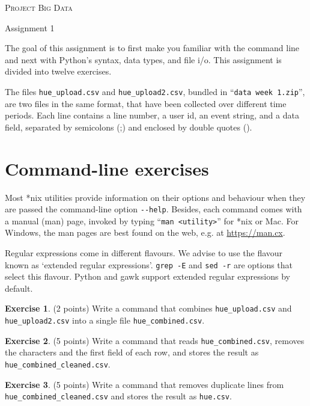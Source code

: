\documentclass[a4paper]{report}
\theoremstyle{definition}
\newtheorem{exercise}{Exercise}
\newcommand{\blankline}{\par\vspace{5mm}}
\begin{document}
	
\begin{center}
	\textsc{\Large Project Big Data}
	\blankline
	
	{\large Assignment 1}
\end{center}

\blankline \noindent The goal of this assignment is to first make you familiar with the command line and next with Python’s syntax, data types, and file i/o. This assignment is divided into twelve exercises.

The files \texttt{hue\_upload.csv} and \texttt{hue\_upload2.csv}, bundled in ``\texttt{data week 1.zip}'',
are two files in the same format, that have been collected over different time periods. Each line contains a line number, a user id, an event string, and a data field, separated by semicolons (;) and enclosed by double quotes (\textquotedbl{}).

\section*{Command-line exercises}
\label{command-line-exercises}

Most *nix utilities provide information on their options and behaviour when
they are passed the command-line option \texttt{-{}-help}. Besides, each
command comes with a manual (man) page, invoked by typing ``\texttt{man
<utility>}'' for
*nix or Mac. For Windows, the man pages are best found on the web, e.g.
at \url{https://man.cx}.

Regular expressions come in different flavours. We advise to use the flavour
known as `extended regular expressions'. \texttt{grep -E} and \texttt{sed -r}
are options that select this flavour. Python and gawk support extended regular
expressions by default.

\begin{exercise}
	(2 points) Write a command that combines \texttt{hue\_upload.csv} and \texttt{hue\_upload2.csv} into a single file \texttt{hue\_combined.csv}.
\end{exercise}

\begin{exercise}
	(5 points) Write a command that reads \texttt{hue\_combined.csv}, removes the \textquotedbl{} characters and the first field of each row, and stores the result as \texttt{hue\_combined\_cleaned.csv}.
\end{exercise}

\begin{exercise}
	(5 points) Write a command that removes duplicate lines from \texttt{hue\_combined\_cleaned.csv} and stores the result as \texttt{hue.csv}.
\end{exercise}
\end{document}
